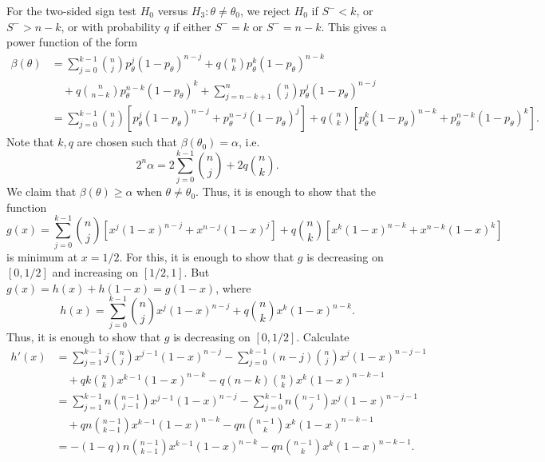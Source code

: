 \documentclass[10pt]{article}
\begin{document}
    For the two-sided sign test $H_0$ versus $H_3: \theta \neq \theta_0$, we
    reject $H_0$ if $S^- < k$, or $S^- > n - k$, or with probability $q$ if
    either $S^- = k$ or $S^- = n - k$. This gives a power function of the form
    \begin{align*}
        \beta(\theta) &=
            \sum_{j = 0}^{k - 1} \binom{n}{j} p_\theta^j(1 - p_\theta)^{n - j} +
            q \binom{n}{k} p_\theta^k (1 - p_\theta)^{n - k} \\
            &\quad + q \binom{n}{n - k} p_\theta^{n - k} (1 - p_\theta)^{k} +
            \sum_{j = n - k + 1}^n \binom{n}{j} p_\theta^j (1 - p_\theta)^{n - j} \\
            &= \sum_{j = 0}^{k - 1} \binom{n}{j}
                \left[ p_\theta^j(1 - p_\theta)^{n - j} + p_\theta^{n - j}(1 - p_\theta)^j \right] +
                q \binom{n}{k} \left[ p_\theta^k (1 - p_\theta)^{n - k} + p_\theta^{n - k}(1 - p_\theta)^k \right].
    \end{align*}
    Note that $k, q$ are chosen such that $\beta(\theta_0) = \alpha$, i.e.\ \[
        2^n\alpha = 2\sum_{j = 0}^{k - 1} \binom{n}{j} + 2q \binom{n}{k}.
    \] We claim that $\beta(\theta) \geq \alpha$ when $\theta \neq \theta_0$.
    Thus, it is enough to show that the function \[
        g(x) = \sum_{j = 0}^{k - 1} \binom{n}{j}
                \left[ x^j(1 - x)^{n - j} + x^{n - j}(1 - x)^j \right] +
                q \binom{n}{k} \left[ x^k (1 - x)^{n - k} + x^{n - k}(1 - x)^k \right]
    \] is minimum at $x = 1 / 2$. For this, it is enough to show that $g$ is
    decreasing on $[0, 1 / 2]$ and increasing on $[1 / 2, 1]$. But $g(x) =
    h(x) + h(1 - x) = g(1 - x)$, where \[
        h(x) = \sum_{j = 0}^{k - 1} \binom{n}{j} x^j(1 - x)^{n - j} +
            q \binom{n}{k} x^k (1 - x)^{n - k}.
    \] Thus, it is enough to show that $g$ is decreasing on $[0, 1 / 2]$.
    Calculate \begin{align*}
        h'(x) &= \sum_{j = 1}^{k - 1} j\binom{n}{j} x^{j - 1}(1 - x)^{n - j} -
            \sum_{j = 0}^{k - 1} (n - j)\binom{n}{j} x^j(1 - x)^{n - j - 1} \\
            &\quad + qk \binom{n}{k} x^{k - 1} (1 - x)^{n - k} -
            q(n - k) \binom{n}{k} x^k (1 - x)^{n - k - 1} \\
        &= \sum_{j = 1}^{k - 1} n\binom{n - 1}{j - 1} x^{j - 1}(1 - x)^{n - j} -
            \sum_{j = 0}^{k - 1} n\binom{n - 1}{j} x^j(1 - x)^{n - j - 1} \\
            &\quad + qn \binom{n - 1}{k - 1} x^{k - 1} (1 - x)^{n - k} -
            qn \binom{n - 1}{k} x^k (1 - x)^{n - k - 1} \\
        &= -(1 - q)n \binom{n - 1}{k - 1} x^{k - 1} (1 - x)^{n - k}
            - qn \binom{n - 1}{k} x^k (1 - x)^{n - k - 1}.
    \end{align*}
\end{document}
